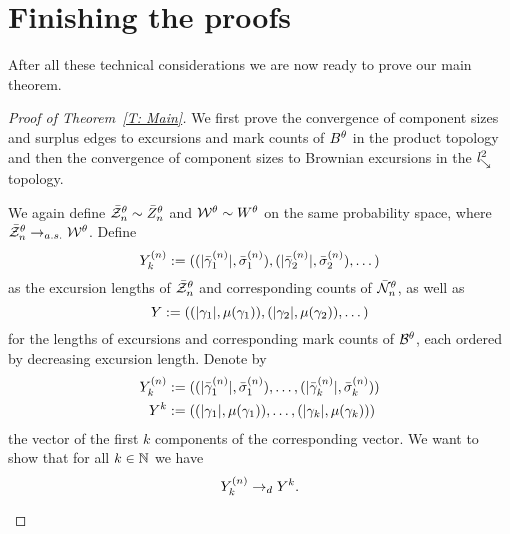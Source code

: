 \section{Finishing the proofs} \label{S: proofs}
After all these technical considerations we are now ready to prove our main theorem.

\begin{proof}[Proof of Theorem~\ref{T: Main}]
	We first prove the convergence of component sizes and surplus edges to excursions and mark counts of $B^{\theta}$ in the product topology
	and then the convergence of component sizes to Brownian excursions in the $\mathit{l}^2_{\searrow}$ topology.
	
	\begin{proofpart}
	We again define $\bar{\mathcal{Z}}^{\theta}_n \sim \bar{Z}^{\theta}_n$ and $\mathcal{W}^{\theta} \sim W^{\theta}$ on the same probability space,
	where $\bar{\mathcal{Z}}^{\theta}_n \rightarrow_{a.s.} \mathcal{W}^{\theta}$.
	Define
	\begin{equation} \label{E: def Yn}
		{Y}^{(n)}_k := ((|\bar{\gamma}^{(n)}_1|, \bar{\sigma}^{(n)}_1), (|\bar{\gamma}^{(n)}_2|, \bar{\sigma}^{(n)}_2), \dots)
	\end{equation}
	as the excursion lengths of $\bar{\mathcal{Z}}^{\theta}_n$ and corresponding counts of $\bar{\mathcal{N}}_n^{\theta}$,
	as well as
	\begin{equation} \label{E: def Y}
		{Y} := ((|\gamma_1|, \mu(\gamma_1)), (|\gamma_2|, \mu(\gamma_2)), \dots)
	\end{equation}
	for the lengths of excursions and corresponding mark counts of $\mathcal{B}^{\theta}$, each ordered by decreasing excursion length.
	Denote by 
	\begin{equation}
		\begin{aligned}
		{Y}^{(n)}_k &:= ((|\bar{\gamma}^{(n)}_1|, \bar{\sigma}^{(n)}_1), \dots, (|\bar{\gamma}^{(n)}_k|, \bar{\sigma}^{(n)}_k)) \\
		{Y}^k  &:= ((|\gamma_1|, \mu(\gamma_1)), \dots, (|\gamma_k|, \mu(\gamma_k)))
		\end{aligned}
	\end{equation}
	the vector of the first $k$ components of the corresponding vector.
	We want to show that for all $k \in \mathbb{N}$ we have
	\begin{equation}
		{Y}^{(n)}_k \rightarrow_d {Y}^k.
	\end{equation}
	

\end{proofpart}
\end{proof}
